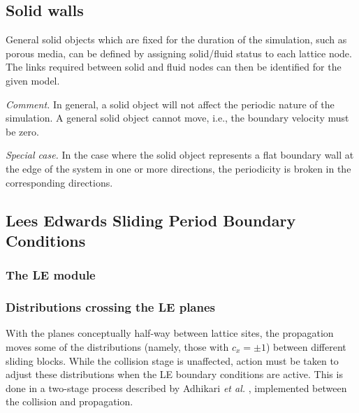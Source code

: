 \subsection{Solid walls}

General solid objects which are fixed for the duration of
the simulation, such as porous media, can be defined
by assigning solid/fluid status to each lattice node. 
The links required between solid and fluid nodes can
then be identified for the given model.

\textit{Comment.} In general, a solid object will not
affect the periodic nature of the simulation. A general
solid object cannot move, i.e., the boundary velocity
must be zero.

\textit{Special case.} In the case where the solid object
represents a flat boundary wall at the edge of the system
in one or more directions, the periodicity is broken in
the corresponding directions.




\subsection{Lees Edwards Sliding Period Boundary Conditions}

\subsubsection{The LE module}

\subsubsection{Distributions crossing the LE planes}

With the planes conceptually half-way between lattice sites, the
propagation moves some of the distributions (namely, those with
$c_x = \pm1$) between different sliding blocks. While the collision
stage is unaffected, action must be taken to adjust these
distributions when the LE boundary conditions are active. This
is done in a two-stage process described by Adhikari \textit{et al.}
\cite{adhikari_desplat}, implemented between the collision and
propagation.

